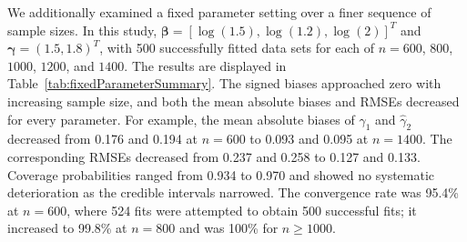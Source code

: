 We additionally examined a fixed parameter setting over a finer sequence of
sample sizes. In this study,
$\boldsymbol\beta=[\log(1.5),\log(1.2),\log(2)]^{T}$ and
$\boldsymbol\gamma=(1.5,1.8)^{T}$, with 500 successfully fitted data sets for
each of $n=600$, $800$, $1000$, $1200$, and $1400$. The results are displayed
in Table~\ref{tab:fixedParameterSummary}. The signed biases approached zero
with increasing sample size, and both the mean absolute biases and RMSEs
decreased for every parameter. For example, the mean absolute biases of
$\hat\gamma_1$ and $\hat\gamma_2$ decreased from 0.176 and 0.194 at $n=600$
to 0.093 and 0.095 at $n=1400$. The corresponding RMSEs decreased from 0.237
and 0.258 to 0.127 and 0.133. Coverage probabilities ranged from 0.934 to
0.970 and showed no systematic deterioration as the credible intervals
narrowed. The convergence rate was 95.4\% at $n=600$, where 524 fits were
attempted to obtain 500 successful fits; it increased to 99.8\% at $n=800$
and was 100\% for $n\geq1000$.

